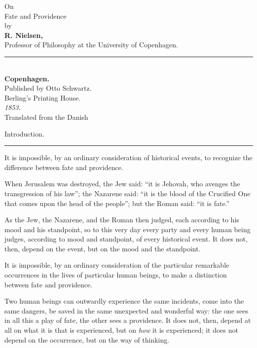 \documentclass[12pt,a4paper,openany]{book}
\newcommand{\opage}[1]{\marginnote{\footnotesize\textit{[#1]}}}
\newcommand{\overskrift}[1]{\begin{center}{\Large #1}\\[0.3em]\rule{3em}{0.4pt}\end{center}\addcontentsline{toc}{section}{#1}}
\begin{document}
\begin{titlepage}
\begin{center}
\vspace*{4em}
{\Large On}\\[1em]
{\Huge Fate and Providence}\\[1.5em]
by\\[1em]
{\Large\textbf{R. Nielsen,}}\\[0.5em]
{\small Professor of Philosophy at the University of Copenhagen.}\\[3em]
\rule{8em}{0.4pt}\\[3em]
\textbf{Copenhagen.}\\[0.5em]
Published by Otto Schwartz.\\[0.5em]
{\small Berling's Printing House.}\\[0.5em]
\textit{1853.}\\[4em]
{\small Translated from the Danish}
\end{center}
\end{titlepage}

\setcounter{footnote}{0}%
\opage{3}\overskrift{Introduction.}

It is impossible, by an ordinary consideration of historical
events, to recognize the difference between fate and providence.

When Jerusalem was destroyed, the Jew said:
``it is Jehovah, who avenges the transgression of his law'';
the Nazarene said: ``it is the blood of the Crucified One
that comes upon the head of the people''; but the Roman said:
``it is fate.''

As the Jew, the Nazarene, and the Roman then
judged, each according to his mood and his standpoint,
so to this very day every party and
every human being judges, according to mood and standpoint,
of every historical event. It does not, then,
depend on the event, but on the mood and
the standpoint.

It is impossible, by an ordinary consideration of
the particular remarkable occurrences in the lives of particular human beings, to make a distinction between fate and providence.

Two human beings can outwardly experience the
same incidents, come into the same dangers, be saved
\setcounter{footnote}{0}%
\opage{4}in the same unexpected and wonderful way: the one
sees in all this a play of fate, the other sees
a providence. It does not, then, depend at all on
what it is that is experienced, but on \emph{how} it is experienced;
it does not depend on the occurrence, but on
the way of thinking.
\end{document}
